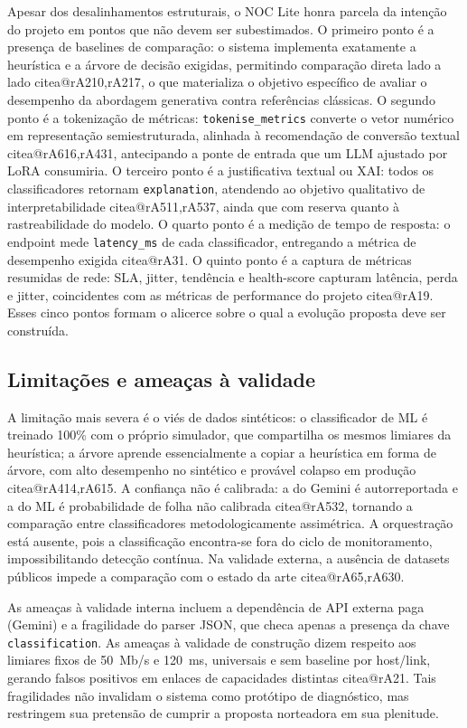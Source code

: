 \documentclass[12pt,a4paper]{article}
\makeatletter
\newcommand{\citea}[1]{\begingroup\edef\@currentlabel{\csname citea@#1\endcsname}\@currentlabel\endgroup}
\makeatother
\begin{document}
Apesar dos desalinhamentos estruturais, o NOC Lite honra parcela da intenção
do projeto em pontos que não devem ser subestimados. O primeiro ponto é a
presença de baselines de comparação: o sistema implementa exatamente a
heurística e a árvore de decisão exigidas, permitindo comparação direta lado
a lado \citea{rA210,rA217}, o que materializa o objetivo específico de avaliar
o desempenho da abordagem generativa contra referências clássicas. O segundo
ponto é a tokenização de métricas: \texttt{tokenise\_metrics} converte o
vetor numérico em representação semiestruturada, alinhada à recomendação de
conversão textual \citea{rA616,rA431}, antecipando a ponte de entrada que um
LLM ajustado por LoRA consumiria. O terceiro ponto é a justificativa textual
ou XAI: todos os classificadores retornam \texttt{explanation}, atendendo ao
objetivo qualitativo de interpretabilidade \citea{rA511,rA537}, ainda que com
reserva quanto à rastreabilidade do modelo. O quarto ponto é a medição de
tempo de resposta: o endpoint mede \texttt{latency\_ms} de cada
classificador, entregando a métrica de desempenho exigida \citea{rA31}. O
quinto ponto é a captura de métricas resumidas de rede: SLA, jitter,
tendência e health-score capturam latência, perda e jitter, coincidentes com
as métricas de performance do projeto \citea{rA19}. Esses cinco pontos formam
o alicerce sobre o qual a evolução proposta deve ser construída.

\subsection{Limitações e ameaças à validade}
\label{sec:ameacas}

A limitação mais severa é o viés de dados sintéticos: o classificador de ML é
treinado 100\% com o próprio simulador, que compartilha os mesmos limiares da
heurística; a árvore aprende essencialmente a copiar a heurística em forma de
árvore, com alto desempenho no sintético e provável colapso em produção
\citea{rA414,rA615}. A confiança não é calibrada: a do Gemini é
autorreportada e a do ML é probabilidade de folha não calibrada
\citea{rA532}, tornando a comparação entre classificadores metodologicamente
assimétrica. A orquestração está ausente, pois a classificação encontra-se
fora do ciclo de monitoramento, impossibilitando detecção contínua. Na
validade externa, a ausência de datasets públicos impede a comparação com o
estado da arte \citea{rA65,rA630}.

As ameaças à validade interna incluem a dependência de API externa paga
(Gemini) e a fragilidade do parser JSON, que checa apenas a presença da chave
\texttt{classification}. As ameaças à validade de construção dizem respeito
aos limiares fixos de 50~Mb/s e 120~ms, universais e sem baseline por
host/link, gerando falsos positivos em enlaces de capacidades distintas
\citea{rA21}. Tais fragilidades não invalidam o sistema como protótipo de
diagnóstico, mas restringem sua pretensão de cumprir a proposta norteadora em
sua plenitude.
\end{document}
